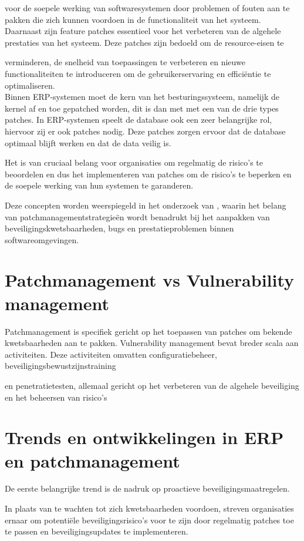 voor de soepele werking van softwaresystemen door problemen of fouten aan te pakken die zich kunnen voordoen in de functionaliteit van het systeem. Daarnaast zijn feature patches essentieel voor het verbeteren van de algehele prestaties van het systeem. Deze patches zijn bedoeld om de resource-eisen te 

verminderen, de snelheid van toepassingen te verbeteren en nieuwe functionaliteiten te introduceren om de gebruikerservaring en efficiëntie te optimaliseren. \\

Binnen ERP-systemen moet de kern van het besturingssysteem, namelijk de kernel af en toe gepatched worden, dit is dan met met een van de drie types patches. In ERP-systemen speelt de database ook een zeer belangrijke rol, hiervoor zij er ook patches nodig. Deze patches zorgen ervoor dat de database optimaal blijft werken en dat de data veilig is.

Het is van cruciaal belang voor organisaties om regelmatig de risico's te beoordelen en dus het implementeren van patches om de risico's te beperken en de soepele werking van hun systemen te garanderen.

Deze concepten worden weerspiegeld in het onderzoek van \textcite{Wrobel2023}, waarin het belang van patchmanagementstrategieën wordt benadrukt bij het aanpakken van beveiligingskwetsbaarheden, bugs en prestatieproblemen binnen softwareomgevingen.

\section{Patchmanagement vs Vulnerability management}
Patchmanagement is specifiek gericht op het toepassen van patches om bekende kwetsbaarheden aan te pakken. Vulnerability management bevat breder scala aan activiteiten. Deze activiteiten omvatten configuratiebeheer, beveiligingsbewustzijnstraining 

en penetratietesten, allemaal gericht op het verbeteren van de algehele beveiliging en het beheersen van risico’s \autocite{Danby2023}


\section{Trends en ontwikkelingen in  ERP en patchmanagement}

De eerste belangrijke trend is de nadruk op proactieve beveiligingsmaatregelen.

In plaats van te wachten tot zich kwetsbaarheden voordoen, streven organisaties ernaar om potentiële beveiligingsrisico's voor te zijn door regelmatig patches toe te passen en beveiligingsupdates te implementeren.

